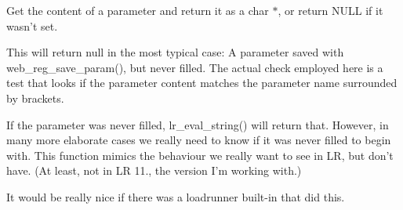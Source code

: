 Get the content of a parameter and return it as a char $\ast$, or return N\-U\-L\-L if it wasn't set. 

This will return null in the most typical case\-: A parameter saved with web\-\_\-reg\-\_\-save\-\_\-param(), but never filled. The actual check employed here is a test that looks if the parameter content matches the parameter name surrounded by brackets.

If the parameter was never filled, lr\-\_\-eval\-\_\-string() will return that. However, in many more elaborate cases we really need to know if it was never filled to begin with. This function mimics the behaviour we really want to see in L\-R, but don't have. (At least, not in L\-R 11., the version I'm working with.)

It would be really nice if there was a loadrunner built-\/in that did this.


